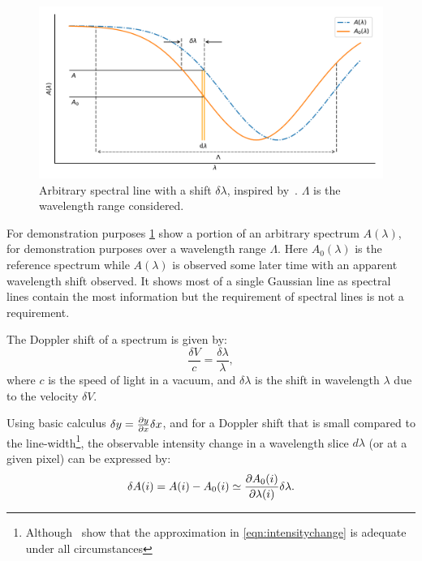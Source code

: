\begin{figure}
    \centering
    \includegraphics[width=0.7\linewidth]{figures/information-content/precision_plot.pdf}
    \caption[Demonstration of a shifted arbitrary spectral line.]{Arbitrary spectral line with a shift \(\delta \lambda\), inspired by~\citet{connes_absolute_1985}.
    \(\Lambda\) is the wavelength range considered.}
    \label{fig:precisionderivation}
\end{figure}

For demonstration purposes  \cref{fig:precisionderivation} show a portion of an arbitrary spectrum \(A(\lambda)\), for demonstration purposes over a wavelength range \(\Lambda\).
Here \(A_0(\lambda)\) is the reference spectrum while \(A(\lambda)\) is observed some later time with an apparent wavelength shift observed.
It shows most of a single Gaussian line as spectral lines contain the most information but the requirement of spectral lines is not a requirement.

The Doppler shift of a spectrum is given by:
\begin{equation}
\frac{\delta V}{c} = \frac{\delta \lambda}{\lambda},
\label{eqn:dopplershift}
\end{equation}
where \(c\) is the speed of light in a vacuum, and \(\delta \lambda\) is the shift in wavelength \(\lambda\) due to the velocity \(\delta V\).


Using basic calculus \(\delta y = \frac{\partial{y}}{\partial{x}} \delta x \nonumber\), and for a Doppler shift that is small compared to the line-width\footnote{Although~\citet{connes_absolute_1985} show that the approximation in \cref{eqn:intensitychange} is adequate under all circumstances}, the observable intensity change in a wavelength slice \(d \lambda\) (or at a given pixel) can be expressed by:
\begin{equation}
\delta A(i) = A(i) - A_0(i) \simeq \frac{\partial{A_0(i)}}{\partial{\lambda(i)}} \delta \lambda.
\label{eqn:intensitychange}
\end{equation}

